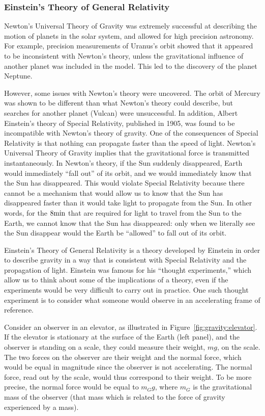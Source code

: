 \subsubsection{Einstein's Theory of General Relativity}

Newton's Universal Theory of Gravity was extremely successful at describing the motion of planets in the solar system, and allowed for high precision astronomy. For example, precision measurements of  Uranus's orbit showed that it appeared to be inconsistent with Newton's theory, unless the gravitational influence of another planet was included in the model. This led to the discovery of the planet Neptune.

However, some issues with Newton's theory were uncovered. The orbit of Mercury was shown to be different than what Newton's theory could describe, but searches for another planet (Vulcan) were unsuccessful. In addition, Albert Einstein's theory of Special Relativity, published in 1905, was found to be incompatible with Newton's theory of gravity. One of the consequences of Special Relativity is that nothing can propagate faster than the speed of light. Newton's Universal Theory of Gravity implies that the gravitational force is transmitted instantaneously. In Newton's theory, if the Sun suddenly disappeared, Earth would immediately ``fall out'' of its orbit, and we would immediately know that the Sun has disappeared. This would violate Special Relativity because there cannot be a mechanism that would allow us to know that the Sun has disappeared faster than it would take light to propagate from the Sun. In other words, for the $8 {\rm min}$ that are required for light to travel from the Sun to the Earth, we cannot know that the Sun has disappeared: only when we literally see the Sun disappear would the Earth be ``allowed'' to fall out of its orbit.

Einstein's Theory of General Relativity is a theory developed by Einstein in order to describe gravity in a way that is consistent with Special Relativity and the propagation of light. Einstein was famous for his ``thought experiments,'' which allow us to think about some of the implications of a theory, even if the experiments would be very difficult to carry out in practice. One such thought experiment is to consider what someone would observe in an accelerating frame of reference.

Consider an observer in an elevator, as illustrated in Figure~\ref{fig:gravity:elevator}. If the elevator is stationary at the surface of the Earth (left panel), and the observer is standing on a scale, they could measure their weight, $mg$, on the scale. The two forces on the observer are their weight and the normal force, which would be equal in magnitude since the observer is not accelerating. The normal force, read out by the scale, would thus correspond to their weight. To be more precise, the normal force would be equal to $m_Gg$, where $m_G$ is the gravitational mass of the observer (that mass which is related to the force of gravity experienced by a mass).

